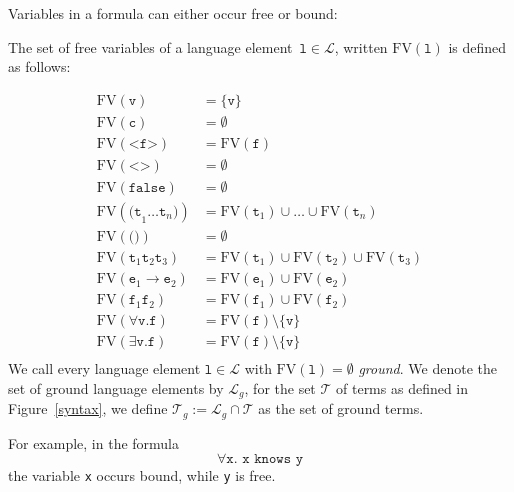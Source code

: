 Variables in a formula can either occur free or bound:
\begin{definition}\label{free}
The set of free variables of a language element~$\texttt{l}\in\mathcal{L}$, written $\text{FV}(\texttt{l})$ is defined as follows:

\begin{align*}
 \text{FV}(\texttt{v}) &= \{\texttt{v}\}\\
 \text{FV}(\texttt{c}) &= \emptyset\\
 \text{FV}(\texttt{<f>}) &= \text{FV}(\texttt{f})\\
 \text{FV}(\texttt{<>}) &= \emptyset\\
 \text{FV}(\texttt{false}) &= \emptyset\\
 \text{FV}(\texttt{(t}_1\ldots\texttt{t}_n\texttt{)})&=\text{FV}(\texttt{t}_1)\cup\ldots\cup\text{FV}(\texttt{t}_n)\\
 \text{FV}(\texttt{()})&= \emptyset\\
 \text{FV}(\texttt{t}_1\texttt{t}_2\texttt{t}_3) &= \text{FV}(\texttt{t}_1)\cup\text{FV}(\texttt{t}_2)\cup \text{FV}(\texttt{t}_3)\\
 \text{FV}(\texttt{e}_1\rightarrow \texttt{e}_2) &= \text{FV}(\texttt{e}_1)\cup\text{FV}(\texttt{e}_2)\\
 \text{FV}(\texttt{f}_1\texttt{f}_2) &= \text{FV}(\texttt{f}_1)\cup\text{FV}(\texttt{f}_2)\\
 \text{FV}(\forall \texttt{v}.\texttt{f}) &= \text{FV}(\texttt{f})\setminus\{\texttt{v}\}\\
 \text{FV}(\exists \texttt{v}.\texttt{f}) &= \text{FV}(\texttt{f})\setminus\{\texttt{v}\}\\
\end{align*}
We call every language element $\texttt{l}\in \mathcal{L}$ with $\text{FV}(\texttt{l})=\emptyset$ \emph{ground}.
% 
We denote the set of ground language elements by $\mathcal{L}_g$, 
for the set $\mathcal{T}$ of terms as defined in Figure~\ref{syntax}, we define  $\mathcal{T}_g:= \mathcal{L}_g\cap \mathcal{T}$ as the set of ground terms.%
\end{definition}
For example,
in the formula
\[
 \forall \texttt{x. x knows y}
\]
the variable \texttt{x} occurs bound, while \texttt{y} is free.



